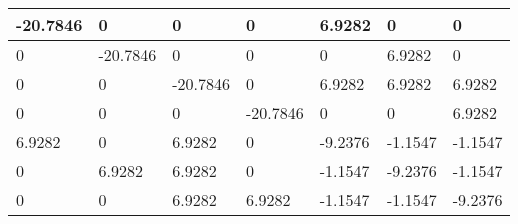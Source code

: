 \begin{tabular}{|l|l|l|l|l|l|l|}
\hline
-20.7846&0&0&0&6.9282&0&0\\\hline
0&-20.7846&0&0&0&6.9282&0\\\hline
0&0&-20.7846&0&6.9282&6.9282&6.9282\\\hline
0&0&0&-20.7846&0&0&6.9282\\\hline
6.9282&0&6.9282&0&-9.2376&-1.1547&-1.1547\\\hline
0&6.9282&6.9282&0&-1.1547&-9.2376&-1.1547\\\hline
0&0&6.9282&6.9282&-1.1547&-1.1547&-9.2376\\\hline
\end{tabular}
